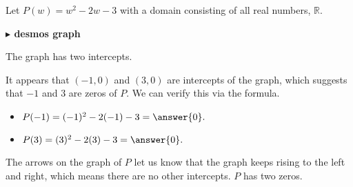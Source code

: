 \documentclass{ximera}
\begin{document}
\begin{example}

Let $P(w) = w^2 - 2w - 3$ with a domain consisting of all real numbers, $\mathbb{R}$.






\begin{image}
\end{image}






\begin{onlineOnly}
\textbf{\textcolor{blue!55!black}{$\blacktriangleright$ desmos graph}} 
\begin{center}
\end{center}
\end{onlineOnly}






The graph has two intercepts.

It appears that $(-1,0)$ and $(3,0)$ are intercepts of the graph, which suggests that $-1$ and $3$ are zeros of $P$.  We can verify this via the formula.


\begin{itemize}
\item $P(-1) = (-1)^2 -2(-1) - 3 = \answer{0}.$
\item $P(3) = (3)^2 -2(3) - 3 = \answer{0}.$
\end{itemize}


The arrows on the graph of $P$ let us know that the graph keeps rising to the left and right, which means there are no other intercepts. $P$ has two zeros.


\end{example}
\end{document}
